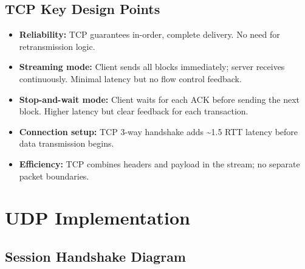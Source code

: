 \documentclass[12pt,a4paper]{article}
\begin{document}
\subsection{TCP Key Design Points}

\begin{tcolorbox}[colback=gray!5,colframe=tcpblue,title=TCP Design Considerations]
\begin{itemize}
  \item \textbf{Reliability:} TCP guarantees in-order, complete delivery. No need for retransmission logic.
  \item \textbf{Streaming mode:} Client sends all blocks immediately; server receives continuously. Minimal latency but no flow control feedback.
  \item \textbf{Stop-and-wait mode:} Client waits for each ACK before sending the next block. Higher latency but clear feedback for each transaction.
  \item \textbf{Connection setup:} TCP 3-way handshake adds \~{}1.5 RTT latency before data transmission begins.
  \item \textbf{Efficiency:} TCP combines headers and payload in the stream; no separate packet boundaries.
\end{itemize}
\end{tcolorbox}

\section{UDP Implementation}
\label{sec:udp}

\subsection{Session Handshake Diagram}
\end{document}
